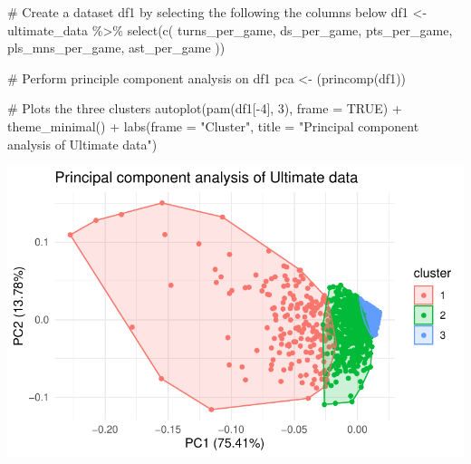 \documentclass[
  letterpaper,
  DIV=11,
  numbers=noendperiod]{scrartcl}
\newenvironment{Shaded}{\begin{snugshade}}{\end{snugshade}}
\newcommand{\AttributeTok}[1]{\textcolor[rgb]{0.40,0.45,0.13}{#1}}
\newcommand{\CommentTok}[1]{\textcolor[rgb]{0.37,0.37,0.37}{#1}}
\newcommand{\ConstantTok}[1]{\textcolor[rgb]{0.56,0.35,0.01}{#1}}
\newcommand{\DecValTok}[1]{\textcolor[rgb]{0.68,0.00,0.00}{#1}}
\newcommand{\FunctionTok}[1]{\textcolor[rgb]{0.28,0.35,0.67}{#1}}
\newcommand{\NormalTok}[1]{\textcolor[rgb]{0.00,0.23,0.31}{#1}}
\newcommand{\OtherTok}[1]{\textcolor[rgb]{0.00,0.23,0.31}{#1}}
\newcommand{\SpecialCharTok}[1]{\textcolor[rgb]{0.37,0.37,0.37}{#1}}
\newcommand{\StringTok}[1]{\textcolor[rgb]{0.13,0.47,0.30}{#1}}
\begin{document}
\begin{Shaded}
\begin{Highlighting}[]
\CommentTok{\# Create a dataset df1 by selecting the following the columns below}
\NormalTok{df1 }\OtherTok{\textless{}{-}}\NormalTok{ ultimate\_data }\SpecialCharTok{\%\textgreater{}\%} \FunctionTok{select}\NormalTok{(}\FunctionTok{c}\NormalTok{(}
\NormalTok{  turns\_per\_game, ds\_per\_game, pts\_per\_game, pls\_mns\_per\_game, ast\_per\_game}
\NormalTok{))}

\CommentTok{\# Perform principle component analysis on df1 }
\NormalTok{pca }\OtherTok{\textless{}{-}}\NormalTok{ (}\FunctionTok{princomp}\NormalTok{(df1))}

\CommentTok{\# Plots the three clusters}
\FunctionTok{autoplot}\NormalTok{(}\FunctionTok{pam}\NormalTok{(df1[}\SpecialCharTok{{-}}\DecValTok{4}\NormalTok{], }\DecValTok{3}\NormalTok{), }\AttributeTok{frame =} \ConstantTok{TRUE}\NormalTok{) }\SpecialCharTok{+} \FunctionTok{theme\_minimal}\NormalTok{() }\SpecialCharTok{+}
  \FunctionTok{labs}\NormalTok{(}\AttributeTok{frame =} \StringTok{"Cluster"}\NormalTok{, }\AttributeTok{title =} \StringTok{"Principal component analysis of Ultimate data"}\NormalTok{)}
\end{Highlighting}
\end{Shaded}

\includegraphics{final_eda_files/figure-pdf/PCA-1.pdf}
\end{document}
